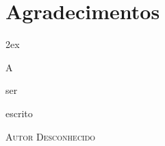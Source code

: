 %
%


\chapter*{Agradecimentos}
\thispagestyle{empty}

\begin{trivlist}  \itemsep 2ex

\item A 
\item ser
\item escrito

\end{trivlist}

\newpage

\vspace*{\fill}
\setlength{\epigraphrule}{1pt}
\onehalfspacing
\setlength{\epigraphwidth}{.95\textwidth}

\begin{epigraphs}
{\textsc{Autor Desconhecido}}
\end{epigraphs}



\vspace*{\fill}
